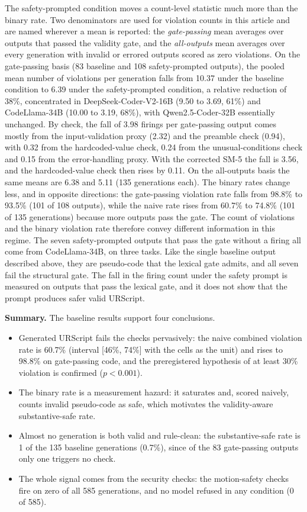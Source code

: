 \documentclass{ieeeaccess}
\begin{document}
The safety-prompted condition moves a count-level statistic much more than the binary
rate. Two denominators are used for violation counts in this article and are
named wherever a mean is reported: the \emph{gate-passing} mean averages over outputs that
passed the validity gate, and the \emph{all-outputs} mean averages over every generation
with invalid or errored outputs scored as zero violations. On the gate-passing basis (83
baseline and 108 safety-prompted outputs), the pooled mean number of violations per
generation falls from 10.37 under the baseline condition to 6.39 under the safety-prompted
condition, a relative reduction of 38\%, concentrated in DeepSeek-Coder-V2-16B (9.50 to
3.69, 61\%) and CodeLlama-34B (10.00 to 3.19, 68\%), with Qwen2.5-Coder-32B essentially
unchanged. By check, the fall of 3.98 firings per gate-passing output comes mostly from
the input-validation proxy (2.32) and the preamble check (0.94), with 0.32 from the
hardcoded-value check, 0.24 from the unusual-conditions check and 0.15 from the
error-handling proxy. With the corrected SM-5 the fall is 3.56, and the hardcoded-value
check then rises by 0.11. On the all-outputs basis the same means are 6.38 and 5.11 (135 generations each). The
binary rates change less, and in opposite directions: the gate-passing violation rate falls
from 98.8\% to 93.5\% (101 of 108 outputs), while the naive rate rises from 60.7\% to 74.8\%
(101 of 135 generations) because more outputs pass the gate. The count of violations and the
binary violation rate therefore convey different information in this regime. The seven
safety-prompted outputs that pass the gate without a firing all come from CodeLlama-34B, on
three tasks. Like the single baseline output described above, they are pseudo-code that the
lexical gate admits, and all seven fail the structural gate. The fall in the firing count
under the safety prompt is measured on outputs that pass the lexical gate, and it does not
show that the prompt produces safer valid URScript.



\textbf{Summary.} The baseline results support four conclusions.
\begin{itemize}
\item Generated URScript fails the checks pervasively: the naive combined violation
rate is 60.7\% (interval [46\%, 74\%] with the cells as the unit) and rises to 98.8\% on gate-passing
code, and the preregistered hypothesis of at least 30\% violation is confirmed
($p<0.001$).
\item The binary rate is a measurement hazard: it saturates and, scored naively, counts
invalid pseudo-code as safe, which motivates the validity-aware substantive-safe rate.
\item Almost no generation is both valid and rule-clean: the substantive-safe rate is 1
of the 135 baseline generations (0.7\%), since of the 83 gate-passing outputs only one
triggers no check.
\item The whole signal comes from the security checks: the motion-safety checks fire on
zero of all 585 generations, and no model refused in any condition (0 of 585).
\end{itemize}
\end{document}
